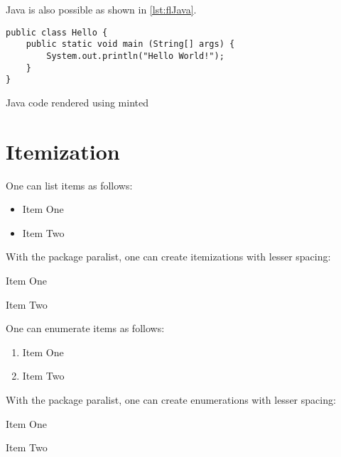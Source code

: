 \documentclass[
  numbers=noenddot,
  english,  %
  a4paper,  %
  twoside,  %
  bibliography=totoc,
  headsepline,
  cleardoublepage=empty,
  parskip=half,
  draft=false
]{scrbook}
\theoremstyle{break}
\begin{document}
Java is also possible as shown in \cref{lst:flJava}.

\begin{ltgexample}
\begin{listing}[htbp]
  \begin{verbatim}
public class Hello {
    public static void main (String[] args) {
        System.out.println("Hello World!");
    }
}
\end{verbatim}
  \caption{Java code rendered using minted}
  \label{lst:flJava}
\end{listing}
\end{ltgexample}

\section{Itemization}

One can list items as follows:

\begin{ltgexample}
\begin{itemize}
  \item Item One
  \item Item Two
\end{itemize}
\end{ltgexample}

With the package paralist, one can create itemizations with lesser spacing:

\begin{ltgexample}
\begin{compactitem}
  \item Item One
  \item Item Two
\end{compactitem}
\end{ltgexample}

One can enumerate items as follows:

\begin{ltgexample}
\begin{enumerate}
  \item Item One
  \item Item Two
\end{enumerate}
\end{ltgexample}

With the package paralist, one can create enumerations with lesser spacing:

\begin{ltgexample}
\begin{compactenum}
  \item Item One
  \item Item Two
\end{compactenum}
\end{ltgexample}
\end{document}
